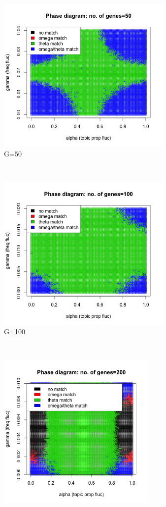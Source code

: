  
 \begin{figure}[ht]
    \centering
    \begin{subfigure}[t]{0.5\textwidth}
        \centering
        \includegraphics[height=3in]{../plots/phase_plot_50.png}
        \caption{G=50}
    \end{subfigure}%
  ~ 
    \begin{subfigure}[t]{0.5\textwidth}
        \centering
        \includegraphics[height=3in]{../plots/phase_plot_100.png}
        \caption{G=100}
    \end{subfigure}   
      ~ 
    \begin{subfigure}[t]{0.5\textwidth}
        \centering
        \includegraphics[height=3in]{../plots/phase_plot_200.png}

\end{subfigure}
\end{figure}
